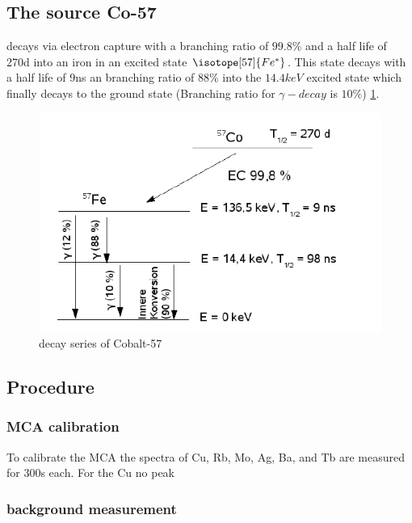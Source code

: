 \subsection{The source Co-57}
 decays via electron capture with a branching ratio of $99.8 \%$ and a half life of 270d into an iron in an excited state $\isotope[57]{Fe^*}$. This state decays with a half life of 9ns an branching ratio of $88\%$ into the $14.4keV$ excited state which finally decays to the ground state (Branching ratio for $\gamma-decay$ is $10\%$) \ref{fig:principles:Zerfallsschema2}. 
\begin{figure}[hbt]
	\centering
	\includegraphics[width=0.5\linewidth]{graphics/Zerfallsschema2}
	\caption[Co-57 decay]{decay series of Cobalt-57}
	\label{fig:principles:Zerfallsschema2}
\end{figure}
\subsection{Procedure}
\subsubsection{MCA calibration}
To calibrate the MCA the spectra of Cu, Rb, Mo, Ag, Ba, and Tb are measured for 300s each. For the Cu no peak
\subsubsection{background measurement}
